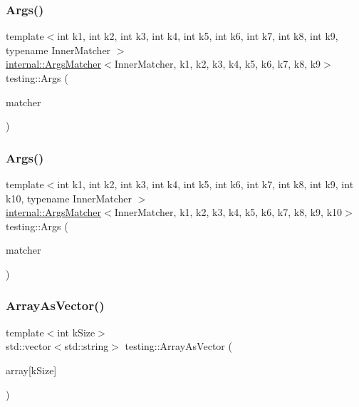 \subsubsection{\texorpdfstring{Args()}{Args()}\hspace{0.1cm}{\footnotesize\ttfamily [10/11]}}
{\footnotesize\ttfamily template$<$int k1, int k2, int k3, int k4, int k5, int k6, int k7, int k8, int k9, typename Inner\+Matcher $>$ \\
\mbox{\hyperlink{classtesting_1_1internal_1_1ArgsMatcher}{internal\+::\+Args\+Matcher}}$<$Inner\+Matcher, k1, k2, k3, k4, k5, k6, k7, k8, k9$>$ testing\+::\+Args (\begin{DoxyParamCaption}\item[{const Inner\+Matcher \&}]{matcher }\end{DoxyParamCaption})\hspace{0.3cm}{\ttfamily [inline]}}

\mbox{\label{namespacetesting_a09ac462e8d6ed468cbfaa9c767aee0aa}} 
\subsubsection{\texorpdfstring{Args()}{Args()}\hspace{0.1cm}{\footnotesize\ttfamily [11/11]}}
{\footnotesize\ttfamily template$<$int k1, int k2, int k3, int k4, int k5, int k6, int k7, int k8, int k9, int k10, typename Inner\+Matcher $>$ \\
\mbox{\hyperlink{classtesting_1_1internal_1_1ArgsMatcher}{internal\+::\+Args\+Matcher}}$<$Inner\+Matcher, k1, k2, k3, k4, k5, k6, k7, k8, k9, k10$>$ testing\+::\+Args (\begin{DoxyParamCaption}\item[{const Inner\+Matcher \&}]{matcher }\end{DoxyParamCaption})\hspace{0.3cm}{\ttfamily [inline]}}

\mbox{\label{namespacetesting_a956d4c522454fa6dfd75b5bbbefe8f9e}} 
\subsubsection{\texorpdfstring{ArrayAsVector()}{ArrayAsVector()}}
{\footnotesize\ttfamily template$<$int k\+Size$>$ \\
std\+::vector$<$std\+::string$>$ testing\+::\+Array\+As\+Vector (\begin{DoxyParamCaption}\item[{const char $\ast$const (\&)}]{array\mbox{[}k\+Size\mbox{]} }\end{DoxyParamCaption})}

